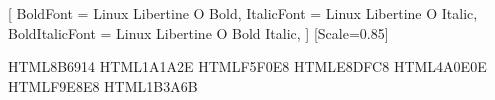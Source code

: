 
\usepackage{fontspec}
  \setmainfont{Linux Libertine O}[
    BoldFont       = Linux Libertine O Bold,
    ItalicFont     = Linux Libertine O Italic,
    BoldItalicFont = Linux Libertine O Bold Italic,
  ]
  \setsansfont{Linux Biolinum O}
  \setmonofont{DejaVu Sans Mono}[Scale=0.85]

\usepackage[
  a4paper,
  top=2.2cm, bottom=2.5cm,
  left=2cm, right=2cm,
  columnsep=0.8cm
]{geometry}

\usepackage[dvipsnames, table]{xcolor}
  \definecolor{GoldRPG}    {HTML}{8B6914}
  \definecolor{DarkRPG}    {HTML}{1A1A2E}
  \definecolor{LightBG}    {HTML}{F5F0E8}
  \definecolor{MidBG}      {HTML}{E8DFC8}
  \definecolor{SecretRed}  {HTML}{4A0E0E}
  \definecolor{SecretBG}   {HTML}{F9E8E8}
  \definecolor{DoriaBlue}  {HTML}{1B3A6B}

\usepackage{microtype}
\usepackage{multicol}
\usepackage{parskip}
  \setlength{\parskip}{4pt}
  \setlength{\parindent}{0pt}

\usepackage{fancyhdr}
  \pagestyle{fancy}
  \fancyhf{}
  \renewcommand{\headrulewidth}{0.4pt}
  \fancyhead[RE,LO]{\small\textcolor{GoldRPG}{\leftmark}}
  \fancyfoot[C]{\small\textcolor{GoldRPG}{\thepage}}

